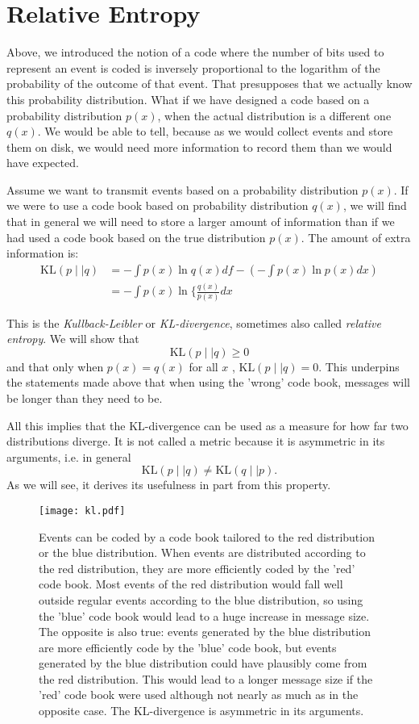 \section{Relative Entropy}
Above, we introduced the notion of a code where the number of bits used to represent an event is coded is inversely proportional to  the logarithm of the probability of
the outcome of that event. That presupposes that we actually know this probability distribution. What if we have designed a code based on a probability distribution $p(x)$,
when the actual distribution is a different one $q(x)$. We would be able to tell, because as we would collect events and store them on disk,
we would need more information to record them than we would have expected. 

Assume we want to transmit events based on a probability distribution  $p(x)$. If we were to use a code book based on probability distribution $q(x)$,
we will find that in general we will need to store a larger amount of information than if we had used a code book based on the true distribution $p(x)$.
The amount of extra information is:
\begin{align}
  \mbox{KL}(p \mid \mid q) &  = - \int p(x) \ln q(x) df - (- \int p(x) \ln p(x) dx ) \nonumber \\
                           &  = - \int p(x) \ln \{ \frac{q(x)}{p(x)} dx
\end{align}

This is the \emph{Kullback-Leibler} or \emph{KL-divergence}, sometimes also called \emph{relative entropy}. We will show that
$$
\mbox{KL}(p \mid \mid q) \ge 0
$$
and that only when $p(x) = q(x)$ for all $x$ , $\mbox{KL}(p \mid \mid q) = 0$. This underpins the statements made above that when using the 'wrong' code book, messages
will be longer than they need to be.

All this implies that the KL-divergence can be used as a measure for how far two distributions diverge. It is not called a metric because it is asymmetric in its arguments, i.e.
in general
$$
\mbox{KL}(p \mid \mid q) \ne \mbox{KL}(q \mid \mid p).
$$
As we will see, it derives its usefulness in part from this property.

\begin{figure}
\begin{center}
\texttt{[image: kl.pdf]}
\end{center}
\caption{Events can be coded by a code book tailored to the red distribution or the blue distribution. When events are distributed according to the red distribution, they are more efficiently coded by the 'red' code book. Most events of the red distribution would fall well outside regular events according to the blue distribution, so using the 'blue' code book would lead to a huge increase in message size. The opposite is also true: events generated by the blue distribution are more efficiently code by the 'blue' code book, but events generated by the blue distribution could have plausibly come from the red distribution. This would lead to a longer message size if the 'red' code book were used although not nearly as much as in the opposite case. The KL-divergence is asymmetric in its arguments.}
\label{fig-kl}
\end{figure}

